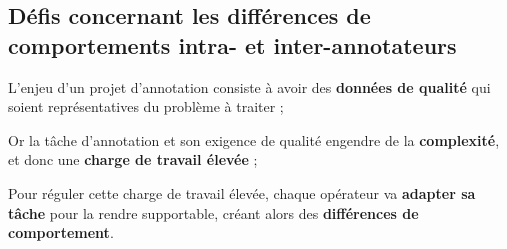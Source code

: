 		
		\subsection{Défis concernant les différences de comportements intra- et inter-annotateurs}
		\label{section:2.3.3-DEFIS-ANNOTATION-ASPECT-HUMAIN}
	
	
	\begin{leftBarSummary}
		\begin{todolist}
			\item[\itemok] L'enjeu d'un projet d'annotation consiste à avoir des \textbf{données de qualité} qui soient représentatives du problème à traiter ;
			\item[\itemok] Or la tâche d'annotation et son exigence de qualité engendre de la \textbf{complexité}, et donc une \textbf{charge de travail élevée} ;
			\item[\itemok] Pour réguler cette charge de travail élevée, chaque opérateur va \textbf{adapter sa tâche} pour la rendre supportable, créant alors des \textbf{différences de comportement}.
		\end{todolist}
	\end{leftBarSummary}